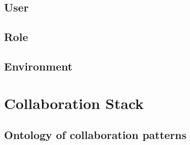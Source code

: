 \subsection{User}

\subsection{Role}

\subsection{Environment}

\section{Collaboration Stack}

\subsection{Ontology of collaboration patterns}

